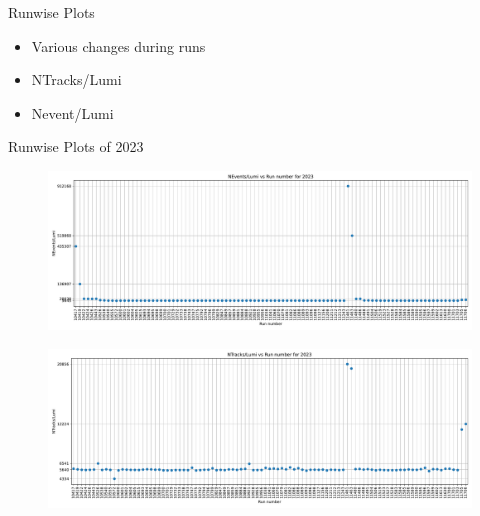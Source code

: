 \begin{frame}{Runwise Plots}
    \begin{itemize}
        \item Various changes during runs
        \item NTracks/Lumi
        \item Nevent/Lumi
    \end{itemize}
\end{frame}

\begin{frame}{Runwise Plots of 2023}
    \begin{figure}
        \centering
        \includegraphics[width=1.0\textwidth]{plots_runwise/NEventsbyLumi_2023.pdf}
    \end{figure}
    \vspace{-0.35cm}
    \begin{figure}
        \centering
        \includegraphics[width=1.0\textwidth]{plots_runwise/NTracksbyLumi_2023.pdf}
    \end{figure}
\end{frame}


